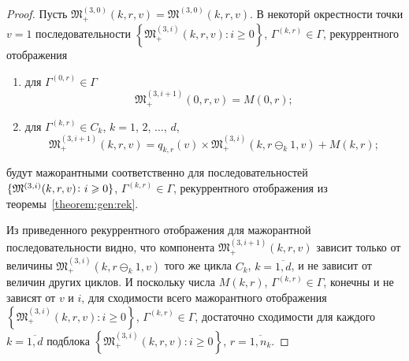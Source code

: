 \documentclass{report}
\begin{document}
\begin{proof}
Пусть $\mathfrak{M}_+^{(3,0)}(k,r,v) =\mathfrak{M}^{(3,0)}(k,r,v)$. В некоторй окрестности точки  $v = 1$  последовательности $\left\{\mathfrak{M}_+^{(3,i)}(k,r,v)\colon i \geqslant 0\right\}$, $\Gamma^{(k,r)} \in \Gamma$, рекуррентного отображения 
\begin{enumerate}
\item для $ \Gamma^{(0,r)} \in \Gamma$ $$\mathfrak{M}_+^{(3,i+1)}(0,r,v) = M(0,r);$$
\item для $\Gamma^{(k, r)} \in C_{k}$,  $k=1$, $2$, $\dots$, $d$,
$$\mathfrak{M}_+^{(3, i+1)}(k,r,v) = q_{k,r} (v)\times  \mathfrak{M}_+^{(3,i)}(k,r \ominus_{k} 1,v) + M(k,r);$$
\end{enumerate}
будут мажорантными соответственно для последовательностей $\{\mathfrak{M}^{(3,i)}(k,r,v)\colon \hm{} i \geqslant 0\}$, $\Gamma^{(k,r)} \in \Gamma$, рекуррентного отображения из теоремы~\ref{theorem:gen:rek}.

Из приведенного рекуррентного отображения для мажорантной последовательности видно, что компонента $\mathfrak{M}_+^{(3,i+1)}(k,r,v)$ зависит только от величины $\mathfrak{M}_+^{(3,i)}(k,r \ominus_{k} 1,v)$ того же цикла $C_k$, $k=\overline{1,d}$, и не зависит от величин других циклов. И поскольку числа $M(k,r)$, $\Gamma^{(k,r)}\in \Gamma$, конечны и не зависят от $v$ и $i$, для сходимости всего мажорантного отображения $\left\{\mathfrak{M}_+^{(3,i)}(k,r,v)\colon i \geqslant 0\right\}$, $\Gamma^{(k,r)} \in \Gamma$, достаточно сходимости для каждого $k=\overline{1,d}$ подблока $\left\{\mathfrak{M}_+^{(3,i)}(k,r,v)\colon i \geqslant 0\right\}$, $r =\overline{1,n_k}$. 


\end{proof}
\end{document}
